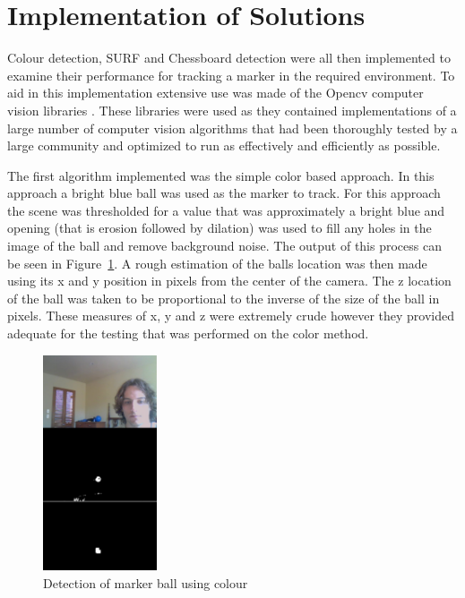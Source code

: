 \section{Implementation of Solutions}

Colour detection, SURF and Chessboard detection were all then implemented to examine their performance for tracking a marker in the required environment. To aid in this implementation extensive use was made of the Opencv computer vision libraries \cite{opencv}. These libraries were used as they contained implementations of a large number of computer vision algorithms that had been thoroughly tested by a large community and optimized to run as effectively and efficiently as possible.

The first algorithm implemented was the simple color based approach. In this approach a bright blue ball was used as the marker to track. For this approach the scene was thresholded for a value that was approximately  a bright blue and opening (that is erosion followed by dilation) was used to fill any holes in the image of the ball and remove background noise. The output of this process can be seen in Figure~\ref{ball}. A rough estimation of the balls location was then made using its x and y position in pixels from the center of the camera. The z location of the ball was taken to be proportional to the inverse of the size of the ball in pixels. These measures of x, y and z were extremely crude however they provided adequate for the testing that was performed on the color method.

\begin{figure}[ht]
	\begin{center}
		\includegraphics[width=0.3\textwidth]{2}
	\end{center}
	\caption{Detection of marker ball using colour}
	\label{ball}
\end{figure}

